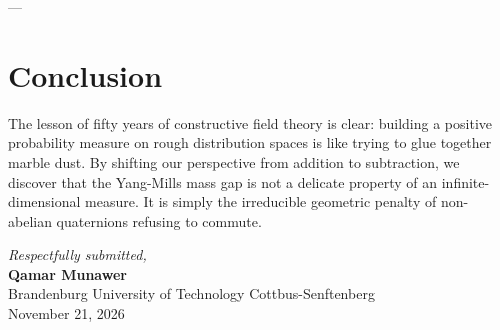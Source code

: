\documentclass[11pt,a4paper]{article}
\begin{document}
---

\section{Conclusion}

The lesson of fifty years of constructive field theory is clear: building a positive probability measure on rough distribution spaces is like trying to glue together marble dust. By shifting our perspective from addition to subtraction, we discover that the Yang-Mills mass gap is not a delicate property of an infinite-dimensional measure. It is simply the irreducible geometric penalty of non-abelian quaternions refusing to commute.

\vspace{0.8cm}
\begin{flushright}
\textit{Respectfully submitted,}\\
\textbf{Qamar Munawer}\\
Brandenburg University of Technology Cottbus-Senftenberg\\
November 21, 2026
\end{flushright}
\end{document}
